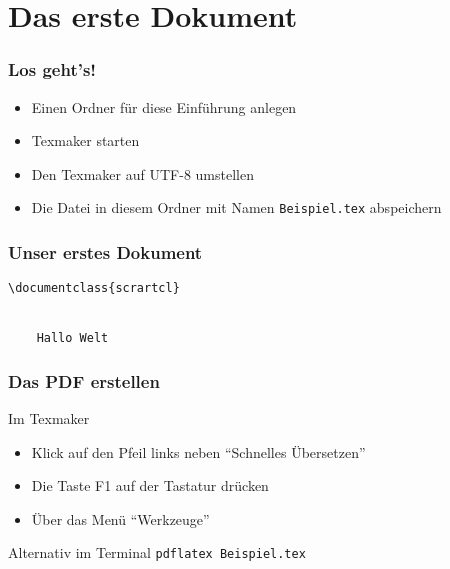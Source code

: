 \section{Das erste Dokument}

\begin{frame}
    \frametitle{Los geht's!}
    \begin{itemize}
        \item Einen Ordner für diese Einführung anlegen
        \item Texmaker starten
        \item Den Texmaker auf UTF-8 umstellen
        \item Die Datei in diesem Ordner mit Namen \texttt{Beispiel.tex} abspeichern
    \end{itemize}
\end{frame}


\begin{frame}[fragile]
    \frametitle{Unser erstes Dokument}
    \begin{codeblock}
    \begin{verbatim}
\documentclass{scrartcl}


    Hallo Welt

\end{verbatim}
    \end{codeblock}
\end{frame}


\begin{frame}[fragile]
    \frametitle{Das PDF erstellen}
    \begin{block}{Im Texmaker}
        \begin{itemize}
            \item Klick auf den Pfeil links neben \enquote{Schnelles Übersetzen}
            \item Die Taste F1 auf der Tastatur drücken
            \item Über das Menü \enquote{Werkzeuge}
        \end{itemize}
    \end{block}\pause
    
    \bigskip
    \begin{block}{Alternativ im Terminal}
        \verb+pdflatex Beispiel.tex+
    \end{block}
\end{frame}


